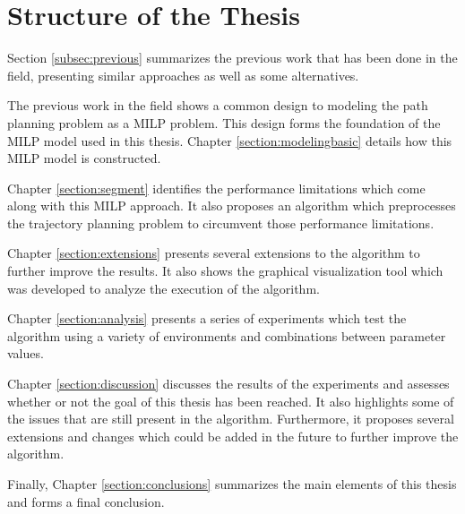 
\section{Structure of the Thesis}
Section \ref{subsec:previous} summarizes the previous work that has been done in the field, presenting similar approaches as well as some  alternatives.
\par
The previous work in the field shows a common design to modeling the path planning problem as a MILP problem. This design forms the foundation of the MILP model used in this thesis. Chapter \ref{section:modelingbasic} details how this MILP model is constructed.
\par
Chapter \ref{section:segment} identifies the performance limitations which come along with this MILP approach. It also proposes an algorithm which preprocesses the trajectory planning problem to circumvent those performance limitations.
\par
Chapter \ref{section:extensions} presents several extensions to the algorithm to further improve the results. It also shows the graphical visualization tool which was developed to analyze the execution of the algorithm.
\par
Chapter \ref{section:analysis} presents a series of experiments which test the algorithm using a variety of environments and combinations between parameter values.
\par
Chapter \ref{section:discussion} discusses the results of the experiments and assesses whether or not the goal of this thesis has been reached. It also highlights some of the issues that are still present in the algorithm. Furthermore, it proposes several extensions and changes which could be added in the future to further improve the algorithm.
\par
Finally, Chapter \ref{section:conclusions} summarizes the main elements of this thesis and forms a final conclusion.

